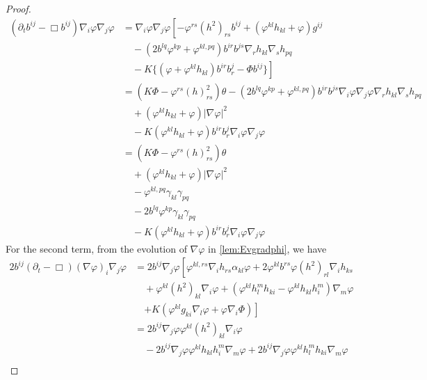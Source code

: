 \documentclass{amsart}
\begin{document}
\begin{proof}
\begin{equation}
\begin{split}
(\partial_{t}b^{ij} - \Box b^{ij})\nabla_i \varphi\nabla_j\varphi &= \nabla_i \varphi \nabla_j \varphi\left[-\varphi^{rs} (h^2)_{rs} b^{ij} + (\varphi^{kl}h_{kl} + \varphi) g^{ij} \right. \\
& \quad - \left(2b^{lq}\varphi^{kp} + \varphi^{kl,pq}\right) b^{ir}b^{js} \nabla_r h_{kl} \nabla_s h_{pq} \\
& \quad - \left. K \{(\varphi + \varphi^{kl}h_{kl}) b^{ir}b^{j}_{r} - \Phi b^{ij}\}\right] \\
&= \left(K\Phi - \varphi^{rs}(h)^2_{rs}\right) \theta - (2b^{lq}\varphi^{kp} + \varphi^{kl,pq}) b^{ir}b^{js}\nabla_i\varphi\nabla_j\varphi\nabla_rh_{kl}\nabla_s h_{pq} \\
&\quad + (\varphi^{kl}h_{kl} + \varphi)|\nabla\varphi|^{2} \\
&\quad - K(\varphi^{kl}h_{kl} + \varphi)b^{ir}b^{j}_{r}\nabla_i \varphi\nabla_j\varphi \\
&= \left(K\Phi - \varphi^{rs}(h)^2_{rs}\right) \theta \\
&\quad + (\varphi^{kl}h_{kl} + \varphi)|\nabla\varphi|^{2} \\
&\quad - \varphi^{kl,pq} \gamma_{kl} \gamma_{pq} \\
&\quad - 2b^{lq}\varphi^{kp} \gamma_{kl} \gamma_{pq} \\
&\quad - K(\varphi^{kl}h_{kl} + \varphi)b^{ir}b^{j}_{r}\nabla_i \varphi\nabla_j\varphi
\end{split}
\end{equation}
For the second term, from the evolution of \(\nabla\varphi\) in \cref{lem:Evgradphi}, we have
\begin{equation}
\label{eq:delt_theta2}
\begin{split}
2 b^{ij} (\partial_{t} - \Box) (\nabla\varphi)_i \nabla_j\varphi &= 2 b^{ij} \nabla_j\varphi \left[\varphi^{kl,rs}\nabla_i h_{rs} \alpha_{kl}\varphi + 2 \varphi^{kl} b^{rs} \varphi(h^2)_{rl} \nabla_i h_{ks} \right. \\
&\quad + \varphi^{kl}(h^2)_{kl}\nabla_i \varphi + \left(\varphi^{kl}h^{m}_{l}h_{ki} - \varphi^{kl}h_{kl}h^{m}_{i}\right) \nabla_m \varphi\\
&\quad \left. + K\left(\varphi^{kl}g_{ki} \nabla_l \varphi + \varphi \nabla_i \Phi\right)\right] \\
&= 2 b^{ij} \nabla_j\varphi \varphi^{kl}(h^2)_{kl}\nabla_i \varphi \\
&\quad - 2 b^{ij} \nabla_j\varphi \varphi^{kl}h_{kl}h^{m}_{i} \nabla_m \varphi + 2 b^{ij} \nabla_j\varphi \varphi^{kl}h^{m}_{l}h_{ki} \nabla_m \varphi \\

\end{split}
\end{equation}
\end{proof}
\end{document}
